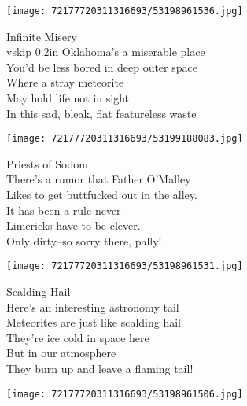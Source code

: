 \documentclass[10pt,letterpaper]{article}
\begin{document}
\begin{center}\texttt{[image: 72177720311316693/53198961536.jpg]}
\end{center}
\begin{center}
Infinite Misery\\
vskip 0.2in
Oklahoma's a miserable place\\
You'd be less bored in deep outer space\\
Where a stray meteorite\\
May hold life not in sight\\
In this sad, bleak, flat featureless waste\\
\end{center}
\pagebreak

\begin{center}
\texttt{[image: 72177720311316693/53199188083.jpg]}
\end{center}

\begin{center}
Priests of Sodom\\
\vskip 0.2in
There's a rumor that Father O'Malley\\
Likes to get buttfucked out in the alley.\\
It has been a rule never\\
Limericks have to be clever.\\
Only dirty--so sorry there, pally!\\
\end{center}
\pagebreak

\begin{center}\texttt{[image: 72177720311316693/53198961531.jpg]}
\end{center}
\begin{center}
Scalding Hail\\
\vskip 0.2in
Here's an interesting astronomy tail\\
Meteorites are just like scalding hail\\
They're ice cold in space here\\
But in our atmosphere\\
They burn up and leave a flaming tail!\\
\end{center}
\pagebreak

\begin{center}
\texttt{[image: 72177720311316693/53198961506.jpg]}
\end{center}
\end{document}
